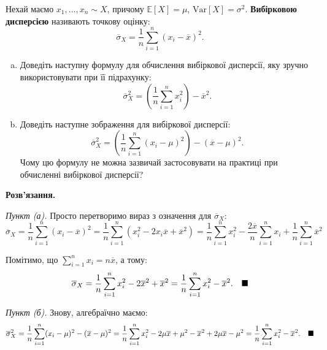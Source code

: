 \documentclass{hw_template}
\begin{document}
\begin{problem}
    Нехай маємо $x_1,\dots,x_n \sim X$, причому $\mathbb{E}[X]=\mu$, $\text{Var}[X] = \sigma^2$. \textbf{Вибірковою дисперсією} називають точкову оцінку:
    \begin{equation*}
        \overline{\sigma}_X = \frac{1}{n}\sum_{i=1}^n (x_i - \overline{x})^2.
    \end{equation*}

    \begin{enumerate}[(a)]
        \item Доведіть наступну формулу для обчислення вибіркової дисперсії, яку зручно використовувати при її підрахунку:
        \begin{equation*}
            \overline{\sigma}_X^2 = \left(\frac{1}{n}\sum_{i=1}^n x_i^2\right) - \overline{x}^2.
        \end{equation*}
        \item Доведіть наступне зображення для вибіркової дисперсії:
        \begin{equation*}
            \overline{\sigma}_X^2 = \left(\frac{1}{n}\sum_{i=1}^n (x_i - \mu)^2\right) - (\overline{x} - \mu)^2.
        \end{equation*}
        Чому цю формулу не можна зазвичай застосовувати на практиці при обчисленні вибіркової дисперсії?
    \end{enumerate}
\end{problem}

\textbf{Розв'язання.}

\textit{Пункт (а).} Просто перетворимо вираз з означення для $\overline{\sigma}_X$:
\begin{equation*}
    \overline{\sigma}_X = \frac{1}{n}\sum_{i=1}^n (x_i - \overline{x})^2 = \frac{1}{n}\sum_{i=1}^n (x_i^2 - 2x_i\overline{x} + \overline{x}^2) = \frac{1}{n}\sum_{i=1}^n x_i^2 - \frac{2\overline{x}}{n}\sum_{i=1}^n x_i + \frac{1}{n}\sum_{i=1}^n\overline{x}^2 
\end{equation*}

Помітимо, що $\sum_{i=1}^n x_i = n\overline{x}$, а тому:
\begin{equation*}
    \overline{\sigma}_X = \frac{1}{n}\sum_{i=1}^n x_i^2 - 2\overline{x}^2 + \overline{x}^2 = \frac{1}{n}\sum_{i=1}^n x_i^2 - \overline{x}^2. \quad \hfill \blacksquare
\end{equation*}

\textit{Пункт (б).} Знову, алгебраїчно маємо:
\begin{equation*}
    \overline{\sigma}_X^2 = \frac{1}{n}\sum_{i=1}^n (x_i - \mu)^2 - (\overline{x} - \mu)^2 = \frac{1}{n}\sum_{i=1}^n x_i^2 - 2\mu\overline{x} + \mu^2 - \overline{x}^2 + 2\mu\overline{x} - \mu^2 = \frac{1}{n}\sum_{i=1}^n x_i^2 - \overline{x}^2. \quad \hfill \blacksquare
\end{equation*}
\end{document}
